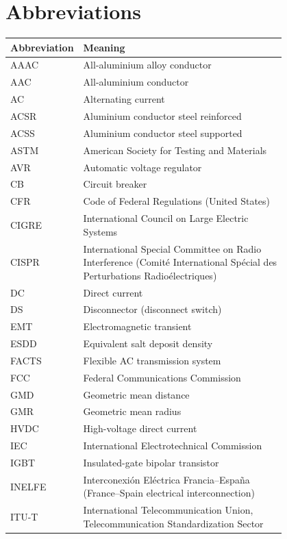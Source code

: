\section{Abbreviations}
\label{sec:abbreviations}

\begin{longtable}{@{}l p{0.80\linewidth}@{}}
  \toprule
  \multicolumn{1}{c}{\textbf{Abbreviation}} & \textbf{Meaning} \\
  \midrule
  \endhead
  AAAC  & All-aluminium alloy conductor \\
  AAC   & All-aluminium conductor \\
  AC    & Alternating current \\
  ACSR  & Aluminium conductor steel reinforced \\
  ACSS  & Aluminium conductor steel supported \\
  ASTM  & American Society for Testing and Materials \\
  AVR   & Automatic voltage regulator \\
  CB    & Circuit breaker \\
  CFR   & Code of Federal Regulations (United States) \\
  CIGRE & International Council on Large Electric Systems \\
  CISPR & International Special Committee on Radio Interference (Comit\'e International Sp\'ecial des Perturbations Radio\'electriques) \\
  DC    & Direct current \\
  DS    & Disconnector (disconnect switch) \\
  EMT   & Electromagnetic transient \\
  ESDD  & Equivalent salt deposit density \\
  FACTS & Flexible AC transmission system \\
  FCC   & Federal Communications Commission \\
  GMD   & Geometric mean distance \\
  GMR   & Geometric mean radius \\
  HVDC  & High-voltage direct current \\
  IEC   & International Electrotechnical Commission \\
  IGBT  & Insulated-gate bipolar transistor \\
  INELFE & Interconexi\'on El\'ectrica Francia--Espa\~na (France--Spain electrical interconnection) \\
  ITU-T & International Telecommunication Union, Telecommunication Standardization Sector \\

\end{longtable}
